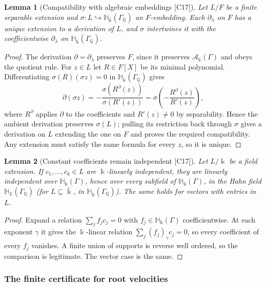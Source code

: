 \documentclass[11pt,oneside]{article}
\numberwithin{equation}{section}
\newtheorem{lemma}[lemma]{Lemma}
\theoremstyle{definition}
\theoremstyle{remark}
\newcommand{\Q}{\mathbb Q}
\newcommand{\src}[1]{\textup{\textsf{\small[#1]}}}
\newcommand{\crH}{\mathbb H_\Bbbk(\Gamma)}
\newcommand{\crA}{\mathcal A_\Bbbk(\Gamma)}
\newcommand{\Hbar}{\mathbb H_{\bar\Bbbk}(\Gamma_\Q)}
\begin{document}
\begin{lemma}[Compatibility with algebraic embeddings \src{C17}]\label{odg:disc:lem:extension}
Let $L/F$ be a finite separable extension and $\sigma:L\hookrightarrow\Hbar$ an
$F$-embedding. Each $\partial_\lambda$ on $F$ has a unique extension to a derivation of $L$,
and $\sigma$ intertwines it with the coefficientwise $\partial_\lambda$ on $\Hbar$.
\end{lemma}
\begin{proof}
The derivation $\partial=\partial_\lambda$ preserves $F$, since it preserves $\crA$ and
obeys the quotient rule. For $z\in L$ let $R\in F[X]$ be its minimal polynomial.
Differentiating $\sigma(R)(\sigma z)=0$ in $\Hbar$ gives
\[
 \partial(\sigma z)
 =-\frac{\sigma(R^\partial(z))}{\sigma(R'(z))}
 =\sigma\!\left(-\frac{R^\partial(z)}{R'(z)}\right),
\]
where $R^\partial$ applies $\partial$ to the coefficients and $R'(z)\ne0$ by
separability. Hence the ambient derivation preserves $\sigma(L)$; pulling its restriction
back through $\sigma$ gives a derivation on $L$ extending the one on $F$ and proves the
required compatibility. Any extension must satisfy the same formula for every $z$, so
it is unique.
\end{proof}

\begin{lemma}[Constant coefficients remain independent \src{C17}]\label{odg:disc:lem:independence}
Let $L/\Bbbk$ be a field extension. If $c_1,\ldots,c_k\in L$ are $\Bbbk$-linearly
independent, they are linearly independent over $\crH$, hence over every subfield of $\crH$,
in the Hahn field $\mathbb H_L(\Gamma_\Q)$ (for $L\subseteq\bar\Bbbk$, in $\Hbar$). The same holds
for vectors with entries in $L$.
\end{lemma}
\begin{proof}
Expand a relation $\sum_jf_jc_j=0$ with $f_j\in\crH$ coefficientwise. At each exponent
$\gamma$ it gives the $\Bbbk$-linear relation $\sum_j(f_j)_\gamma c_j=0$, so every
coefficient of every $f_j$ vanishes. A finite union of supports is reverse well ordered,
so the comparison is legitimate. The vector case is the same.
\end{proof}

\subsubsection{The finite certificate for root velocities}\label{odg:disc:sub:certificate}
\end{document}
